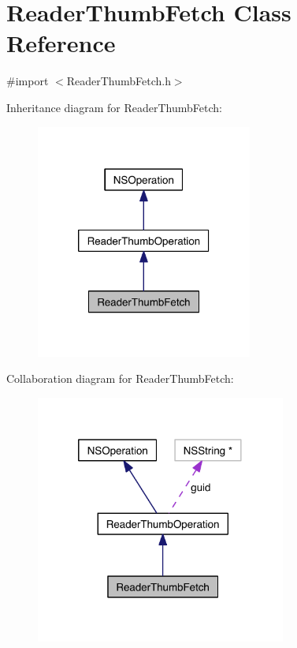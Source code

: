\hypertarget{interface_reader_thumb_fetch}{\section{Reader\-Thumb\-Fetch Class Reference}
\label{dd/d32/interface_reader_thumb_fetch}
}


{\ttfamily \#import $<$Reader\-Thumb\-Fetch.\-h$>$}



Inheritance diagram for Reader\-Thumb\-Fetch\-:
\nopagebreak
\begin{figure}[H]
\begin{center}
\leavevmode
\includegraphics[width=202pt]{d7/d43/interface_reader_thumb_fetch__inherit__graph}
\end{center}
\end{figure}


Collaboration diagram for Reader\-Thumb\-Fetch\-:
\nopagebreak
\begin{figure}[H]
\begin{center}
\leavevmode
\includegraphics[width=233pt]{d3/d1a/interface_reader_thumb_fetch__coll__graph}
\end{center}
\end{figure}
